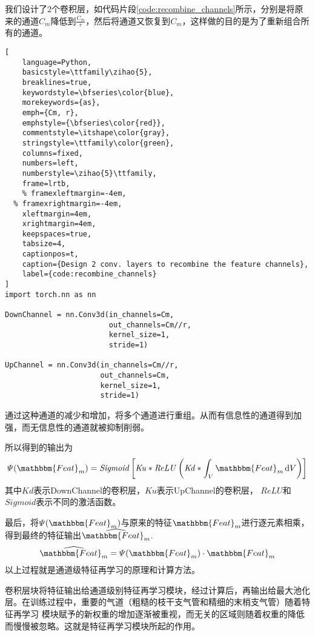我们设计了2个卷积层，如代码片段\ref{code:recombine_channels}所示，分别是将原来的通道$C_m$降低到$\frac{C_m}{r}$，然后将通道又恢复到$C_m$，这样做的目的是为了重新组合所有的通道。
\begin{lstlisting}[
	language=Python,
	basicstyle=\ttfamily\zihao{5},
	breaklines=true,
	keywordstyle=\bfseries\color{blue},
	morekeywords={as},
	emph={Cm, r},
	emphstyle={\bfseries\color{red}},
	commentstyle=\itshape\color{gray},
	stringstyle=\ttfamily\color{green},
	columns=fixed,
	numbers=left,
	numberstyle=\zihao{5}\ttfamily,
	frame=lrtb,
	% framexleftmargin=-4em,
  %	framexrightmargin=-4em,
	xleftmargin=4em,
	xrightmargin=4em,
	keepspaces=true,
	tabsize=4,
	captionpos=t,
	caption={Design 2 conv. layers to recombine the feature channels},
	label={code:recombine_channels}
]
import torch.nn as nn

DownChannel = nn.Conv3d(in_channels=Cm, 
                        out_channels=Cm//r, 
                        kernel_size=1, 
                        stride=1)
										 
UpChannel = nn.Conv3d(in_channels=Cm//r, 
                      out_channels=Cm, 
                      kernel_size=1, 
                      stride=1)
\end{lstlisting}
通过这种通道的减少和增加，将多个通道进行重组。从而有信息性的通道得到加强，而无信息性的通道就被抑制削弱。

所以得到的输出为
\begin{equation}
    \varPsi(\mathbbm{Feat}_m) = \mathit{Sigmoid}\left[\mathit{Ku} * \mathit{ReLU}\left(\mathit{Kd} * \int_{V}\mathbbm{Feat}_m \dd V\right)\right]
\end{equation}
其中$Kd$表示DownChannel的卷积层，$Ku$表示UpChannel的卷积层， $ReLU$和$Sigmoid$表示不同的激活函数。

最后，将$\varPsi(\mathbbm{Feat}_m)$与原来的特征$\mathbbm{Feat}_m$进行逐元素相乘，得到最终的特征输出$\widehat{\mathbbm{Feat}_m}$.
\begin{equation}\label{eq:features_element_wise_multiply}
    \widehat{\mathbbm{Feat}_m} = \varPsi(\mathbbm{Feat}_m) \cdot \mathbbm{Feat}_m
\end{equation}
以上过程就是通道级特征再学习的原理和计算方法。

卷积层块将特征输出给通道级别特征再学习模块，经过计算后，再输出给最大池化层。在训练过程中，重要的气道（粗糙的枝干支气管和精细的末梢支气管）随着特征再学习
模块赋予的新权重的增加逐渐被重视，而无关的区域则随着权重的降低而慢慢被忽略。这就是特征再学习模块所起的作用。

